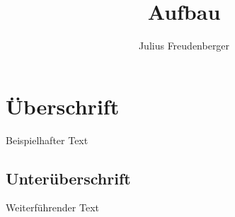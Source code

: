\documentclass[a4paper]{book}           %
\title{Aufbau}                          %
\author{Julius Freudenberger}
\begin{document}
\maketitle
\tableofcontents
\section{Überschrift}
Beispielhafter Text
\subsection{Unterüberschrift}
Weiterführender Text
\end{document}
